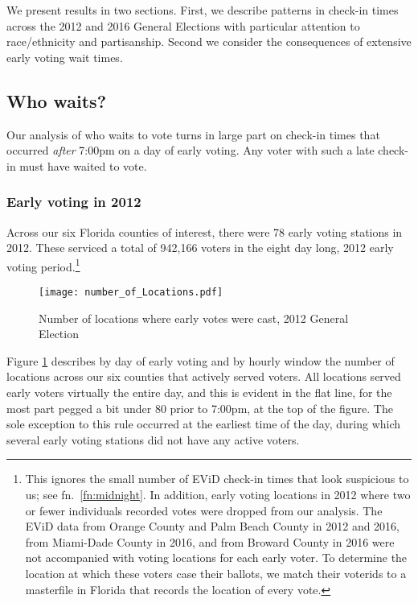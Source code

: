 \documentclass[12pt,titlepage]{article}
\begin{document}
We present results in two sections.  First, we describe patterns in
check-in times across the 2012 and 2016 General Elections with
particular attention to race/ethnicity and partisanship.  Second we
consider the consequences of extensive early voting wait times.


\subsection*{Who waits?}

Our analysis of who waits to vote turns in large part on check-in
times that occurred \emph{after} 7:00pm on a day of early voting.  Any
voter with such a late check-in must have waited to vote.

\subsubsection*{Early voting in 2012}

Across our six Florida counties of interest, there were 78 early
voting stations in 2012.  These serviced a total of 942,166 voters in
the eight day long, 2012 early voting period.\footnote{This ignores
  the small number of EViD check-in times that look suspicious to us;
  see fn.\ \ref{fn:midnight}.  In addition, early voting locations in
  2012 where two or fewer individuals recorded votes were dropped from
  our analysis.  The EViD data from Orange County and Palm Beach
  County in 2012 and 2016, from Miami-Dade County in 2016, and from
  Broward County in 2016 were not accompanied with voting locations
  for each early voter.  To determine the location at which these
  voters case their ballots, we match their voterids to a masterfile
  in Florida that records the location of every
  vote.}  %



\begin{figure}[!ht]
  \caption{Number of locations where early votes were cast, 2012 General Election}
  \label{fig:nrlocs2012}
  \centering
    \centering\texttt{[image: number\_of\_Locations.pdf]}
\end{figure}

Figure \ref{fig:nrlocs2012} describes by day of early voting and by
hourly window the number of locations across our six counties that
actively served voters.  All locations served early voters virtually
the entire day, and this is evident in the flat line, for the most
part pegged a bit under 80 prior to 7:00pm, at the top of the figure.
The sole exception to this rule occurred at the earliest time of the
day, during which several early voting stations did not have any
active voters.
\end{document}

